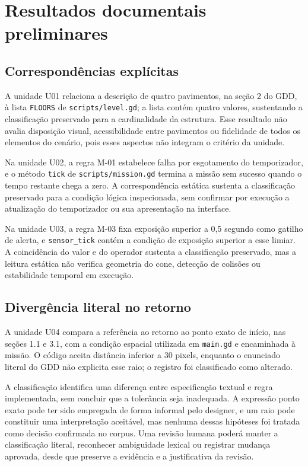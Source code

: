 \section{Resultados documentais preliminares}
\subsection{Correspondências explícitas}
A unidade U01 relaciona a descrição de quatro pavimentos, na seção 2 do GDD, à lista \texttt{FLOORS} de \texttt{scripts/level.gd}; a lista contém quatro valores, sustentando a classificação preservado para a cardinalidade da estrutura. Esse resultado não avalia disposição visual, acessibilidade entre pavimentos ou fidelidade de todos os elementos do cenário, pois esses aspectos não integram o critério da unidade.

Na unidade U02, a regra M-01 estabelece falha por esgotamento do temporizador, e o método \texttt{tick} de \texttt{scripts/mission.gd} termina a missão sem sucesso quando o tempo restante chega a zero. A correspondência estática sustenta a classificação preservado para a condição lógica inspecionada, sem confirmar por execução a atualização do temporizador ou sua apresentação na interface.

Na unidade U03, a regra M-03 fixa exposição superior a 0,5 segundo como gatilho de alerta, e \texttt{sensor\_tick} contém a condição de exposição superior a esse limiar. A coincidência do valor e do operador sustenta a classificação preservado, mas a leitura estática não verifica geometria do cone, detecção de colisões ou estabilidade temporal em execução.

\subsection{Divergência literal no retorno}
A unidade U04 compara a referência ao retorno ao ponto exato de início, nas seções 1.1 e 3.1, com a condição espacial utilizada em \texttt{main.gd} e encaminhada à missão. O código aceita distância inferior a 30 pixels, enquanto o enunciado literal do GDD não explicita esse raio; o registro foi classificado como alterado.

A classificação identifica uma diferença entre especificação textual e regra implementada, sem concluir que a tolerância seja inadequada. A expressão ponto exato pode ter sido empregada de forma informal pelo designer, e um raio pode constituir uma interpretação aceitável, mas nenhuma dessas hipóteses foi tratada como decisão confirmada no corpus. Uma revisão humana poderá manter a classificação literal, reconhecer ambiguidade lexical ou registrar mudança aprovada, desde que preserve a evidência e a justificativa da revisão.

